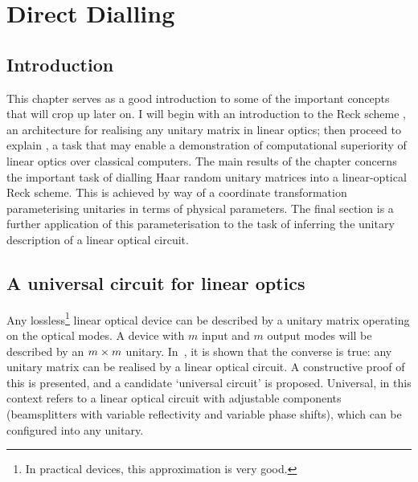 \chapter{Direct Dialling}
\label{ch:DirectDialling}

\section{Introduction}
\label{sec:DDIntro}
This chapter serves as a good introduction to some of the important concepts
that will crop up later on. I will begin with an introduction to the Reck
scheme \cite{reck94}, an architecture for realising any unitary matrix in linear
optics; then proceed to explain \bosonsampling{} \cite{bosonsampling}, a task
that may enable a demonstration of computational superiority of linear optics
over classical computers. The main results of the chapter concerns the important
task of dialling Haar random unitary matrices into a linear-optical Reck scheme.
This is achieved by way of a coordinate transformation parameterising unitaries
in terms of physical parameters. The final section is a further application of
this parameterisation to the task of inferring the unitary description of a
linear optical circuit.

\section{A universal circuit for linear optics}
\label{sec:ReckScheme}
Any lossless\footnote{In practical devices, this approximation is very good.
} linear optical device can be
described by a unitary matrix operating on the optical modes. A device with
\(m\) input and \(m\) output modes will be described by an \(m \times m\) unitary.
In~\cite{reck94}, it is shown that the converse is true: any unitary matrix can
be realised by a linear optical circuit. A constructive proof of this is
presented, and a candidate `universal circuit' is proposed. Universal, in this
context refers to a linear optical circuit with adjustable components
(beamsplitters with variable reflectivity and variable phase shifts), which can
be configured into any unitary.


